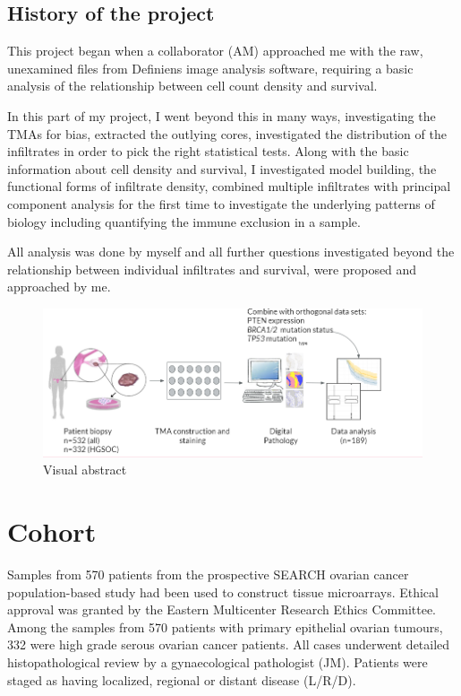 \subsection{History of the project}
This project began when a collaborator (AM) approached me with the raw, unexamined files from Definiens image analysis software, requiring a basic analysis of the relationship between cell count density and survival. 

In this part of my project, I went beyond this in many ways, investigating the TMAs for bias, extracted the outlying cores, investigated the distribution of the infiltrates in order to pick the right statistical tests. Along with the basic information about cell density and survival, I investigated model building, the functional forms of infiltrate density, combined multiple infiltrates with principal component analysis for the first time to investigate the underlying patterns of biology including quantifying the immune exclusion in a sample. 

All analysis was done by myself and all further questions investigated beyond the relationship between individual infiltrates and survival, were proposed and approached by me.



\begin{figure}
    \centering
    \includegraphics{Chapter2/Figs/Raster/Thesis_visual_abstract.PNG}
    \caption[Visual Abstract]{Visual abstract}
    \label{fig:visual_abstract}
\end{figure}

\section{Cohort}

Samples from 570 patients from the prospective SEARCH ovarian cancer population-based study had been used to construct tissue microarrays. Ethical approval was granted by the Eastern Multicenter Research Ethics Committee. Among the samples from 570 patients with primary epithelial ovarian tumours, 332 were high grade serous ovarian cancer patients. All cases underwent detailed histopathological review by a gynaecological pathologist (JM). Patients were staged as having localized, regional or distant disease (L/R/D).


